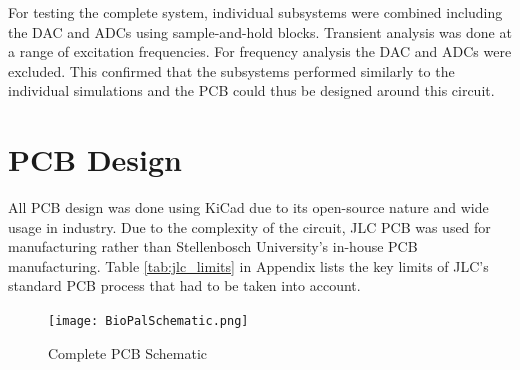 For testing the complete system, individual subsystems were combined including the DAC and ADCs using sample-and-hold blocks. Transient analysis was done at a range of excitation frequencies. For frequency analysis the DAC and ADCs were excluded. This confirmed that the subsystems performed similarly to the individual simulations and the PCB could thus be designed around this circuit. 

\section{PCB Design}\label{sec:PCB}

All PCB design was done using KiCad due to its open-source nature and wide usage in industry. Due to the complexity of the circuit, JLC PCB was used for manufacturing rather than Stellenbosch University's in-house PCB manufacturing. Table \ref{tab:jlc_limits} in Appendix  lists the key limits of JLC's standard PCB process that had to be taken into account. 

\begin{figure}[H]
    \centering
    \texttt{[image: BioPalSchematic.png]}
    \caption{Complete PCB Schematic}
    \label{fig:pcb_schematic}
\end{figure}


